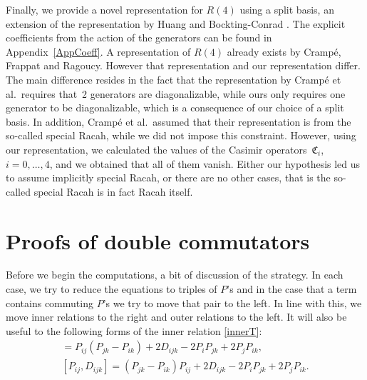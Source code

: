 \documentclass[pdftex]{sigma}
\numberwithin{equation}{section}
\begin{document}
Finally, we provide a novel representation for $R(4)$ using a split basis, an extension of the representation by Huang and Bockting-Conrad \cite{HBC2020}. The explicit coefficients from the action of the generators can be found in Appendix~\ref{AppCoeff}. A representation of $R(4)$ already exists \cite{Crampe2023} by Cramp\'{e}, Frappat and Ragoucy. However that representation and our representation differ. The main difference resides in the fact that the representation by Cramp\'{e} et al.\ requires that~2 generators are diagonalizable, while ours only requires one generator to be diagonalizable, which is a consequence of our choice of a split basis. In addition, Cramp\'e et al.\ assumed that their representation is from the so-called special Racah, while we did not impose this constraint. However, using our representation, we calculated the values of the Casimir operators~$\mathfrak{C}_i$,~${i=0,\dots,4}$, and we obtained that all of them vanish. Either our hypothesis led us to assume implicitly special Racah, or there are no other cases, that is the so-called special Racah is in fact Racah itself.

\appendix

\section{Proofs of double commutators}\label{AppendixA}
Before we begin the computations, a bit of discussion of the strategy. In each case, we try to reduce the equations to triples of $P$'s and in the case that a term contains commuting $P$'s we try to move that pair to the left. In line with this, we move inner relations to the right and outer relations to the left. It will also be useful to the following forms of the inner relation \eqref{innerT}:
\begin{gather*}
 [P_{ij}, D_{ ijk}] = P_{ij} (P_{jk}- P_{ik}) +2D_{ijk} - 2P_i P_{jk} +2P_jP_{ik},\\
[P_{ij}, D_{ ijk}] = (P_{jk}- P_{ik}) P_{ij} +2D_{ijk} - 2P_i P_{jk} +2P_jP_{ik}.\end{gather*}
\end{document}
